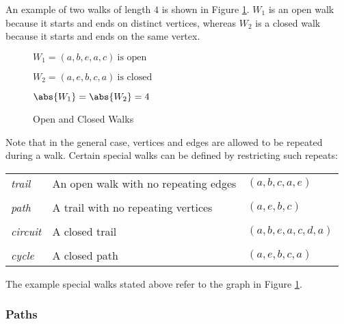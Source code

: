 An example of two walks of length \(4\) is shown in Figure \ref{fig:walks}.  \(W_1\) is an open walk because it
starts and ends on distinct vertices, whereas \(W_2\) is a closed walk because it starts and ends on the same
vertex.

\begin{figure}[h]
  \label{fig:walks}
  \begin{minipage}{3in}
    \begin{center}
    \end{center}
  \end{minipage}
  \begin{minipage}{3in}
    \(W_1=(a,b,e,a,c)\ \text{is open}\)

    \(W_2=(a,e,b,c,a)\ \text{is closed}\)

    \bigskip

    \(\abs{W_1}=\abs{W_2}=4\)
  \end{minipage}
  \caption{Open and Closed Walks}
\end{figure}

Note that in the general case, vertices and edges are allowed to be repeated during a walk.  Certain special walks
can be defined by restricting such repeats:

\begin{center}
  \begin{tabular}{lll}
    \emph{trail} & An open walk with no repeating edges & \((a,b,c,a,e)\) \\
    \\
    \emph{path} & A trail with no repeating vertices & \((a,e,b,c)\) \\
    \\
    \emph{circuit} & A closed trail & \((a,b,e,a,c,d,a)\) \\
    \\
    \emph{cycle} & A closed path & \((a,e,b,c,a)\)
  \end{tabular}
\end{center}

The example special walks stated above refer to the graph in Figure \ref{fig:walks}.

\subsubsection{Paths}

